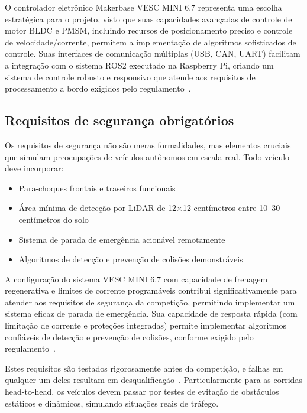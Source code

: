 O controlador eletrônico Makerbase VESC MINI 6.7 representa uma escolha
estratégica para o projeto, visto que suas capacidades avançadas de controle de
motor BLDC e PMSM, incluindo recursos de posicionamento preciso e controle de
velocidade/corrente, permitem a implementação de algoritmos sofisticados de
controle. Suas interfaces de comunicação múltiplas (USB, CAN, UART) facilitam a
integração com o sistema ROS2 executado na Raspberry Pi, criando um sistema de
controle robusto e responsivo que atende aos requisitos de processamento a
bordo exigidos pelo regulamento~\cite{F1TENTHRules2023}.

\subsection{Requisitos de segurança obrigatórios}

Os requisitos de segurança não são meras formalidades, mas elementos cruciais
que simulam preocupações de veículos autônomos em escala real. Todo veículo
deve incorporar:

\begin{itemize}
      \item Para-choques frontais e traseiros funcionais
      \item Área mínima de detecção por LiDAR de 12×12 centímetros entre 10--30 centímetros do solo
      \item Sistema de parada de emergência acionável remotamente
      \item Algoritmos de detecção e prevenção de colisões demonstráveis
\end{itemize}

A configuração do sistema VESC MINI 6.7 com capacidade de frenagem regenerativa
e limites de corrente programáveis contribui significativamente para atender
aos requisitos de segurança da competição, permitindo implementar um sistema
eficaz de parada de emergência. Sua capacidade de resposta rápida (com
limitação de corrente e proteções integradas) permite implementar algoritmos
confiáveis de detecção e prevenção de colisões, conforme exigido pelo
regulamento~\cite{MoralesF1TENTH2021}.

Estes requisitos são testados rigorosamente antes da competição, e falhas em
qualquer um deles resultam em desqualificação~\cite{MoralesF1TENTH2021}.
Particularmente para as corridas head-to-head, os veículos devem passar por
testes de evitação de obstáculos estáticos e dinâmicos, simulando situações
reais de tráfego.

